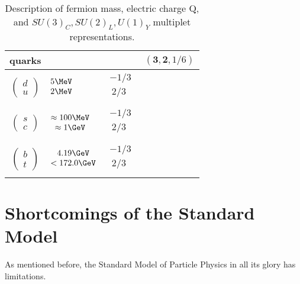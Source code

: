 \begin{table}[!htp]
\begin{tabular}{|cllc|}
\hline
\textbf{quarks}&&&$(\mathbf{3}, \mathbf{2}, 1/6)$\\
\hline 
$\begin{pmatrix} d\\ u \end{pmatrix}$
 &$\begin{matrix} 5\MeV\\  2\MeV \\ \end{matrix}$
  &$\begin{matrix} -1/3\\  ~2/3 \\ \end{matrix}$&\\  
\hline
$\begin{pmatrix} s\\ c \end{pmatrix}$
&$\begin{matrix}\approx100\MeV \\  \approx1\GeV \\ \end{matrix}$
  &$\begin{matrix} -1/3\\  ~2/3 \\ \end{matrix}$&\\  
  \hline
  $\begin{pmatrix} b\\ t \end{pmatrix}$
&$\begin{matrix} 4.19\GeV\\  <172.0\GeV \\ \end{matrix}$
  &$\begin{matrix} -1/3\\  ~2/3 \\ \end{matrix}$&\\  
\hline

\hline
\end{tabular}
\caption{Description of fermion mass, electric charge Q, and $SU(3)_{C}, SU(2)_{L}, U(1)_{Y}$ multiplet representations. }
\label{tab:fermion}
\end{table}  
\FloatBarrier

\section{Shortcomings of the Standard Model}
\label{sec:fail}
As mentioned before, the Standard Model of Particle Physics in all its glory has limitations.

